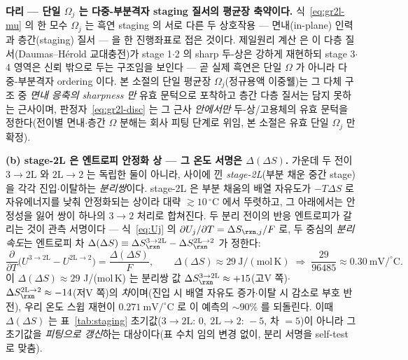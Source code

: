 \begin{srcbox}
\textbf{다리 --- 단일 $\Omega_j$ 는 다중-부분격자 staging 질서의 평균장 축약이다.} 식~\eqref{eq:gr2l-mu} 의 한
모수 $\Omega_j$ 는 흑연 staging 의 서로 다른 두 상호작용 --- 면내(in-plane) 인력과 층간(staging) 질서 --- 을
한 진행좌표로 접은 것이다. 제일원리 계산\cite{persson2010b} 은 이 다층 질서(Daumas--H\'erold 교대충전)가
stage 1$\cdot$2 의 sharp 두-상은 강하게 재현하되 stage 3$\cdot$4 영역은 신뢰 밖으로 두는 구조임을 보인다 ---
곧 실제 흑연은 단일 $\Omega$ 가 아니라 다중-부분격자 ordering 이다. 본 소절의 단일 평균장 $\Omega_j$(정규용액
이중웰)는 그 다체 구조 중 \emph{면내 응축의 sharpness 만} 유효 문턱으로 포착하고 층간 다층 질서는 담지 못하는
근사이며, 판정자~\eqref{eq:gr2l-disc} 는 그 근사 \emph{안에서만} 두-상/고용체의 유효 문턱을 정한다(전이별
면내$\cdot$층간 $\Omega$ 분해는 회사 피팅 단계로 위임, 본 소절은 유효 단일 $\Omega_j$ 만 확정).
\end{srcbox}

\textbf{(b) stage-2L 은 엔트로피 안정화 상 --- 그 온도 서명은 $\Delta(\Delta S)$.} 가운데 두 전이
$3\!\to\!2\mathrm L$ 와 $2\mathrm L\!\to\!2$ 는 독립한 둘이 아니라, 사이에 낀 \emph{stage-2L}(부분 채운 중간 stage)을
각각 진입$\cdot$이탈하는 \emph{분리쌍}이다. stage-2L 은 부분 채움의 배열 자유도가 $-T\Delta S$ 로 자유에너지를
낮춰 안정화되는 상이라 대략 $\gtrsim10\,^\circ$C 에서 뚜렷하고, 그 아래에서는 안정성을 잃어 쌍이 하나의
$3\!\to\!2$ 처리로 합쳐진다. 두 분리 전이의 반응 엔트로피가 갈리는 것이 관측 서명이다 --- 식~\eqref{eq:Uj} 의
$\partial U_j/\partial T=\Delta S_{\rxn,j}/F$ 로, 두 중심의 \emph{분리 속도}는 엔트로피 차
$\Delta(\Delta S)\equiv\Delta S_{\rxn}^{3\to2\mathrm L}-\Delta S_{\rxn}^{2\mathrm L\to2}$ 가 정한다:
\begin{equation}
\frac{\partial}{\partial T}\big(U^{3\to2\mathrm L}-U^{2\mathrm L\to2}\big)
=\frac{\Delta(\Delta S)}{F},
\qquad \Delta(\Delta S)\approx29\ \mathrm{J/(mol\,K)}
\;\Rightarrow\;
\frac{29}{96485}\approx0.30\ \mathrm{mV/^\circ C}.
\label{eq:gr2l-split}
\end{equation}
이 $\Delta(\Delta S)\approx29$ J/(mol\,K) 는 분리쌍 값 $\Delta S_{\rxn}^{3\to2\mathrm L}\approx+15$(고V 쪽)$\cdot$
$\Delta S_{\rxn}^{2\mathrm L\to2}\approx-14$(저V 쪽)의 \emph{차}이며(진입 시 배열 자유도 증가$\cdot$이탈 시 감소로
부호 반전), 우리 온도 스윕 재현이 $0.271\ \mathrm{mV/^\circ C}$ 로 이 예측의 $\sim90\%$ 를 되돌린다. 이때
$\Delta(\Delta S)$ 는 표~\ref{tab:staging} 초기값($3\!\to\!2\mathrm L{:}\,0,\ 2\mathrm L\!\to\!2{:}\,-5$, 차 $=5$)이
아니라 그 초기값을 \emph{피팅으로 갱신}하는 대상이다(표 수치 임의 변경 없이, 분리 서명을 self-test 로 맞춤).

